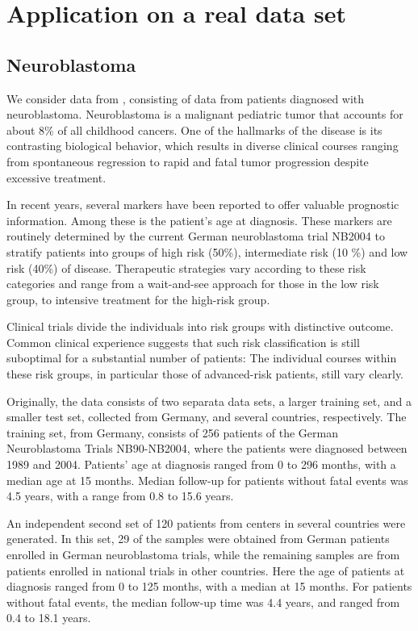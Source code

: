 \chapter{Application on a real data set}

\section{Neuroblastoma}
We consider data from \citet{oberthuer-data}, consisting of data from patients diagnosed with neuroblastoma.
Neuroblastoma is a malignant pediatric tumor that accounts for about 8\% of all childhood cancers.
One of the hallmarks of the disease is its contrasting biological behavior, which results in diverse clinical courses ranging from spontaneous regression to rapid and fatal tumor progression despite excessive treatment.

In recent years, several markers have been reported to offer valuable prognostic information.
Among these is the patient's age at diagnosis.
These markers are routinely determined by the current German neuroblastoma trial NB2004 to stratify patients into groups of high risk (50\%),
intermediate risk (10 \%) and low risk (40\%) of disease.
Therapeutic strategies vary according to these risk categories and range from a wait-and-see approach for those in the low risk group,
to intensive treatment for the high-risk group.

Clinical trials divide the individuals into risk groups with distinctive outcome.
Common clinical experience suggests that such risk classification is still suboptimal for a substantial number of patients:
The individual courses within these risk groups,
in particular those of advanced-risk patients, still vary clearly.

Originally, the data consists of two separata data sets, a larger training set, and a smaller test set, collected from Germany, and several countries, respectively.
The training set, from Germany, consists of 256 patients of the German Neuroblastoma Trials NB90-NB2004, where the patients were diagnosed between 1989 and 2004.
Patients' age at diagnosis ranged from 0 to 296 months, with a median age at 15 months.
Median follow-up for patients without fatal events was 4.5 years, with a range from 0.8 to 15.6 years.

An independent second set of 120 patients from centers in several countries were generated.
In this set, 29 of the samples were obtained from German patients enrolled in German neuroblastoma trials, while the remaining samples are from patients enrolled in national trials in other countries.
Here the age of patients at diagnosis ranged from 0 to 125 months, with a median at 15 months.
For patients without fatal events, the median follow-up time was 4.4 years, and ranged from 0.4 to 18.1 years.

